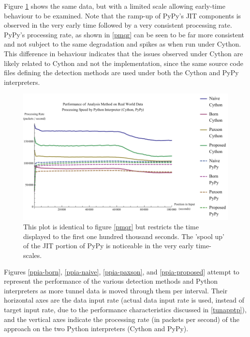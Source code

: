 \documentclass[12pt]{report}
\theoremstyle{remark}
\theoremstyle{definition}
\theoremstyle{definition}
\theoremstyle{definition}
\begin{document}
Figure \ref{pmqr-100k} shows the same data, but with a limited scale allowing
early-time behaviour to be examined. Note that the ramp-up of PyPy's JIT
components is observed in the very early time followed by a very consistent
processing rate. PyPy's processing rate, as shown in \ref{pmqr} can be seen to be
far more consistent and not subject to the same degradation and spikes as when
run under Cython. This difference in behaviour indicates that the issues
observed under Cython are likely related to Cython and not the implementation,
since the same source code files defining the detection methods are used
under both the Cython and PyPy interpreters.

\begin{figure}
\centering
\includegraphics[width=\textwidth]{../figures/pmqr-100k.pdf}
\caption[Performance of Analysis Method and Python Interpreter on Real World
Data - Early Time]{This plot is identical to figure \ref{pmqr} but restricts the time
displayed to the first one hundred thousand seconds. The 'spool up' of the JIT
portion of PyPy is noticeable in the very early time-scales.}
\label{pmqr-100k}
\end{figure}

Figures \ref{ppia-born}, \ref{ppia-naive}, \ref{ppia-paxson}, and
\ref{ppia-proposed} attempt to represent the performance of the various
detection methods and Python interpreters as more tunnel data is moved through
them per interval. Their horizontal axes are the data input rate (actual data
input rate is used, instead of target input rate, due to the performance
characteristics discussed in \ref{tunapptp}), and the vertical axes indicate the
processing rate (in packets per second) of the approach on the two Python
interpreters (Cython and PyPy).
\end{document}
